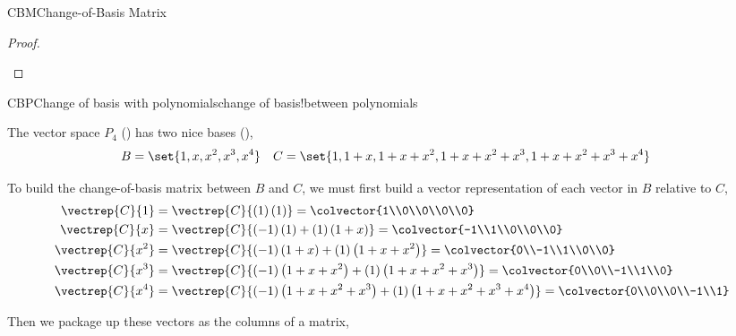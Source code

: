 \begin{subsect}{CBM}{Change-of-Basis Matrix}
\begin{proof}
\begin{para}
\end{para}
%
\end{proof}
%
\begin{example}{CBP}{Change of basis with polynomials}{change of basis!between polynomials}
\begin{para}The vector space $P_4$ () has two nice bases (),
%
\begin{align*}
B&=\set{1,x,x^2,x^3,x^4}
&
C&=\set{1,1+x,1+x+x^2,1+x+x^2+x^3,1+x+x^2+x^3+x^4}
\end{align*}
\end{para}
%
\begin{para}To build the change-of-basis matrix between $B$ and $C$, we must first build a vector representation of each vector in $B$ relative to $C$,
%
\begin{align*}
\vectrep{C}{1}
&=\vectrep{C}{(1)\left(1\right)}
=\colvector{1\\0\\0\\0\\0}\\
%
\vectrep{C}{x}
&=\vectrep{C}{(-1)\left(1\right)+(1)\left(1+x\right)}
=\colvector{-1\\1\\0\\0\\0}\\
%
\vectrep{C}{x^2}
&=\vectrep{C}{(-1)\left(1+x\right)+(1)\left(1+x+x^2\right)}
=\colvector{0\\-1\\1\\0\\0}\\
%
\vectrep{C}{x^3}
&=\vectrep{C}{(-1)\left(1+x+x^2\right)+(1)\left(1+x+x^2+x^3\right)}
=\colvector{0\\0\\-1\\1\\0}\\
%
\vectrep{C}{x^4}
&=\vectrep{C}{(-1)\left(1+x+x^2+x^3\right)+(1)\left(1+x+x^2+x^3+x^4\right)}
=\colvector{0\\0\\0\\-1\\1}
%
\end{align*}
\end{para}
%
\begin{para}Then we package up these vectors as the columns of a matrix,
%
\begin{equation*}

\end{equation*}
\end{para}
\end{example}
\end{subsect}
